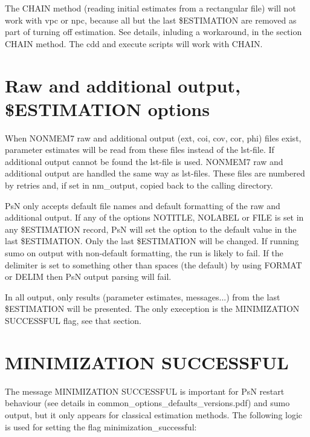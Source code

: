 The CHAIN method (reading initial estimates from a rectangular file) will not work with vpc or npc, because all but the last \$ESTIMATION are removed as part of turning off estimation. See details, inluding a workaround, in the section CHAIN method. The cdd and execute scripts will work with CHAIN.


\section{Raw and additional output, \$ESTIMATION options}

When NONMEM7 raw and additional output (ext, coi, cov, cor, phi) files exist, parameter estimates will be read from these files instead of the lst-file. If additional output cannot be found the lst-file is used. NONMEM7 raw and additional output are handled the same way as lst-files. These files are numbered by retries and, if set in nm\_output, copied back to the calling directory.

PsN only accepts default file names and default formatting of the raw and additional output. If any of the options NOTITLE, NOLABEL or FILE is set in any \$ESTIMATION record, PsN will set the option to the default value in the last \$ESTIMATION. Only the last \$ESTIMATION will be changed. If running sumo on output with non-default formatting, the run is likely to fail. If the delimiter is set to something other than spaces (the default) by using FORMAT or DELIM then PsN output parsing will fail.

In all output, only results (parameter estimates, messages...) from the last \$ESTIMATION will be presented. The only exeception is the MINIMIZATION SUCCESSFUL flag, see that section.

\section{MINIMIZATION SUCCESSFUL}

The message MINIMIZATION SUCCESSFUL is important for PsN restart behaviour (see details in common\_options\_defaults\_versions.pdf) and sumo output, but it only appears for classical estimation methods. The following logic is used for setting the flag minimization\_successful:

